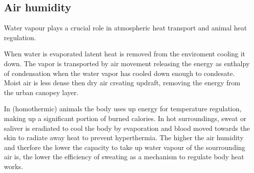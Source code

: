 \subsection{Air humidity}
Water vapour plays a crucial role in atmospheric heat transport and animal heat regulation. 

When water is evaporated latent heat is removed from the enviroment cooling it down. 
The vapor is transported by air movement releasing the energy as enthalpy of condensation when the water vapor has cooled down enough to condesate. %
Moist air is less dense then dry air creating updraft, removing the energy from the urban canopey layer. 

In (homothermic) animals the body uses up energy for temperature regulation, making up a significant portion of burned calories. 
In hot surroundings, sweat or saliver is eradiated to cool the body by evaporation and blood moved towards the skin to radiate away heat to prevent hyperthermia. 
The higher the air humidity and therfore the lower the capacity to take up water vapour of the sourrounding air is, the lower the efficiency of sweating as a mechanism to regulate body heat works. 



